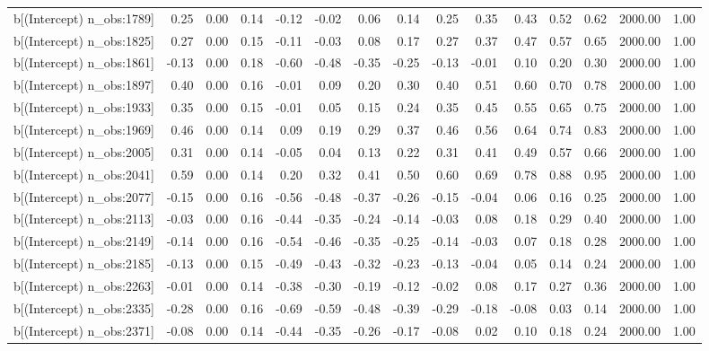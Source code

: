 \begin{table}[ht]
\begin{tabular}{rrrrrrrrrrrrrrr}
  b[(Intercept) n\_obs:1789] & 0.25 & 0.00 & 0.14 & -0.12 & -0.02 & 0.06 & 0.14 & 0.25 & 0.35 & 0.43 & 0.52 & 0.62 & 2000.00 & 1.00 \\ 
  b[(Intercept) n\_obs:1825] & 0.27 & 0.00 & 0.15 & -0.11 & -0.03 & 0.08 & 0.17 & 0.27 & 0.37 & 0.47 & 0.57 & 0.65 & 2000.00 & 1.00 \\ 
  b[(Intercept) n\_obs:1861] & -0.13 & 0.00 & 0.18 & -0.60 & -0.48 & -0.35 & -0.25 & -0.13 & -0.01 & 0.10 & 0.20 & 0.30 & 2000.00 & 1.00 \\ 
  b[(Intercept) n\_obs:1897] & 0.40 & 0.00 & 0.16 & -0.01 & 0.09 & 0.20 & 0.30 & 0.40 & 0.51 & 0.60 & 0.70 & 0.78 & 2000.00 & 1.00 \\ 
  b[(Intercept) n\_obs:1933] & 0.35 & 0.00 & 0.15 & -0.01 & 0.05 & 0.15 & 0.24 & 0.35 & 0.45 & 0.55 & 0.65 & 0.75 & 2000.00 & 1.00 \\ 
  b[(Intercept) n\_obs:1969] & 0.46 & 0.00 & 0.14 & 0.09 & 0.19 & 0.29 & 0.37 & 0.46 & 0.56 & 0.64 & 0.74 & 0.83 & 2000.00 & 1.00 \\ 
  b[(Intercept) n\_obs:2005] & 0.31 & 0.00 & 0.14 & -0.05 & 0.04 & 0.13 & 0.22 & 0.31 & 0.41 & 0.49 & 0.57 & 0.66 & 2000.00 & 1.00 \\ 
  b[(Intercept) n\_obs:2041] & 0.59 & 0.00 & 0.14 & 0.20 & 0.32 & 0.41 & 0.50 & 0.60 & 0.69 & 0.78 & 0.88 & 0.95 & 2000.00 & 1.00 \\ 
  b[(Intercept) n\_obs:2077] & -0.15 & 0.00 & 0.16 & -0.56 & -0.48 & -0.37 & -0.26 & -0.15 & -0.04 & 0.06 & 0.16 & 0.25 & 2000.00 & 1.00 \\ 
  b[(Intercept) n\_obs:2113] & -0.03 & 0.00 & 0.16 & -0.44 & -0.35 & -0.24 & -0.14 & -0.03 & 0.08 & 0.18 & 0.29 & 0.40 & 2000.00 & 1.00 \\ 
  b[(Intercept) n\_obs:2149] & -0.14 & 0.00 & 0.16 & -0.54 & -0.46 & -0.35 & -0.25 & -0.14 & -0.03 & 0.07 & 0.18 & 0.28 & 2000.00 & 1.00 \\ 
  b[(Intercept) n\_obs:2185] & -0.13 & 0.00 & 0.15 & -0.49 & -0.43 & -0.32 & -0.23 & -0.13 & -0.04 & 0.05 & 0.14 & 0.24 & 2000.00 & 1.00 \\ 
  b[(Intercept) n\_obs:2263] & -0.01 & 0.00 & 0.14 & -0.38 & -0.30 & -0.19 & -0.12 & -0.02 & 0.08 & 0.17 & 0.27 & 0.36 & 2000.00 & 1.00 \\ 
  b[(Intercept) n\_obs:2335] & -0.28 & 0.00 & 0.16 & -0.69 & -0.59 & -0.48 & -0.39 & -0.29 & -0.18 & -0.08 & 0.03 & 0.14 & 2000.00 & 1.00 \\ 
  b[(Intercept) n\_obs:2371] & -0.08 & 0.00 & 0.14 & -0.44 & -0.35 & -0.26 & -0.17 & -0.08 & 0.02 & 0.10 & 0.18 & 0.24 & 2000.00 & 1.00 \\ 

\end{tabular}
\end{table}
